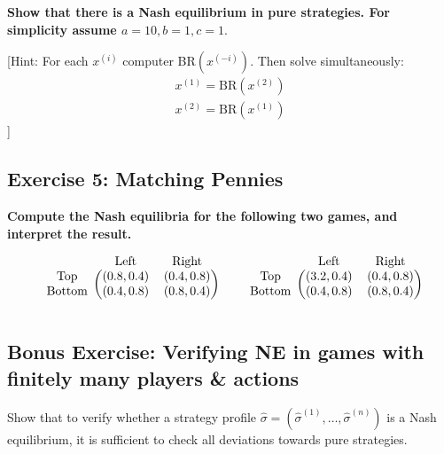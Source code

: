 \documentclass[10pt]{article}
\begin{document}
\textbf{Show that there is a Nash equilibrium in pure strategies. For simplicity
assume \(a=10, b=1, c=1\)}.

[Hint: For each \(x^{(i)}\) computer BR\((x^{(-i)})\). Then solve simultaneously:
\begin{align*}
    x^{(1)}= \text{BR}(x^{(2)}) \\
    x^{(2)}= \text{BR}(x^{(1)})
\end{align*}
]

\subsection*{Exercise 5: Matching Pennies}

\textbf{Compute the Nash equilibria for the following two games, and interpret the result.}

\begin{equation*}
    \begin{blockarray}{ccc}
        & \text{Left} & \text{Right} \\
        \begin{block}{c(cc)}
            \text{Top} &    (0.8, 0.4) & (0.4, 0.8) \\
            \text{Bottom} & (0.4, 0.8) & (0.8, 0.4) \\
        \end{block}
    \end{blockarray}\qquad
    \begin{blockarray}{ccc}
        & \text{Left} & \text{Right} \\
        \begin{block}{c(cc)}
            \text{Top} &    (3.2, 0.4) & (0.4, 0.8) \\
            \text{Bottom} & (0.4, 0.8) & (0.8, 0.4) \\
        \end{block}
    \end{blockarray}
    \end{equation*}

\newpage

\subsection*{Bonus Exercise: Verifying NE in games with finitely many players \& actions}

Show that to verify whether a strategy profile \(\hat{\sigma} =
(\hat{\sigma}^{(1)}, \dots, \hat{\sigma}^{(n)})\) is a Nash equilibrium, it is
sufficient to check all deviations towards pure strategies.
\end{document}
